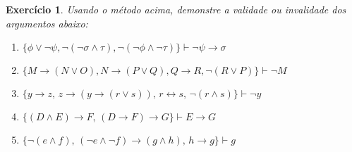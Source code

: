 \documentclass[a4paper,10pt]{article}
\newtheorem{exrcc}{Exercício}[subsection] %
\begin{document}
\begin{exrcc}

Usando o método acima, demonstre a validade ou invalidade dos argumentos abaixo:

\begin{enumerate}
\setlength{\itemsep}{0pt}
 \item $\{\phi\vee\neg\psi, \neg(\neg\sigma\wedge\tau),
\neg(\neg\phi\wedge\neg\tau)\}\vdash\neg\psi\rightarrow\sigma$
\item $\{M\rightarrow(N\vee{}O), N\rightarrow(P\vee{}Q), Q\rightarrow{}R,
\neg(R\vee{}P)\}\vdash\neg{}M$
\item
$\{y\rightarrow{}z,\,{}z\rightarrow(y\rightarrow(r\vee{}s)),\,r\leftrightarrow{}s,\,
\neg(r\wedge{}s)\}\vdash\neg{}y$
\item $\{(D\wedge{}E)\rightarrow{}F,\,
(D\rightarrow{}F)\rightarrow{}G\}\vdash{}E\rightarrow{}G$
\item $\{\neg(e\wedge{}f),\, (\neg{}e\wedge\neg{}f)\rightarrow(g\wedge{}h),\,
h\rightarrow{}g\}\vdash{}g$
\end{enumerate}

 
\end{exrcc}

\pagebreak
\end{document}
